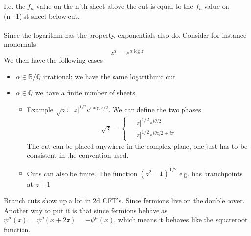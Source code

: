 \documentclass[a4paper,12pt]{article}
\begin{document}
I.e. the $f_n$ value on the n'th sheet above the cut is equal to the $f_n$ value on (n+1)'st sheet below cut.\\\\
Since the logarithm has the property, exponentials also do. Consider for instance monomials
\begin{equation}
z^{\alpha}=e^{\alpha\log z}
\end{equation}
We then have the following cases
\begin{itemize}
\item $\alpha\in \mathds R / \mathds Q$   irrational: we have the same logarithmic cut
\item  $\alpha\in \mathds Q$ we have a finite number of sheets
\begin{itemize}
\item Example $\sqrt{z}:~~|z|^{1/2}e^{i\arg z/2}$. We can define the two phases
\begin{equation}
\sqrt{z}=\begin{cases}
&|z|^{1/2}e^{i\theta /2}\\
&|z|^{1/2}e^{i\theta z/2+i\pi}
\end{cases}
\end{equation}
The cut can be placed anywhere in the complex plane, one just has to be consistent in the convention used. 
\item Cuts can also be finite. The function $(z^2-1)^{1/2}$ e.g. has branchpoints at $z\pm 1$
\end{itemize}
\end{itemize}
Branch cuts show up a lot in 2d CFT's. Since fermions live on the double cover. Another way to put it is that since fermions behave as $\psi^\mu(x)=\psi^\mu(x+2\pi)=-\psi^\mu(x)$, which means it behaves like the squareroot function.
\end{document}
